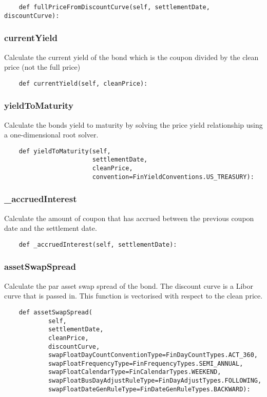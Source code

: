 \documentclass[twoside,11pt]{book}
\begin{document}
\begin{lstlisting}
    def fullPriceFromDiscountCurve(self, settlementDate, discountCurve):
\end{lstlisting}

\subsubsection*{{\bf currentYield}}
Calculate the current yield of the bond which is the coupon divided by the clean price (not the full price) 

\begin{lstlisting}
    def currentYield(self, cleanPrice):
\end{lstlisting}

\subsubsection*{{\bf yieldToMaturity}}
Calculate the bonds yield to maturity by solving the price yield relationship using a one-dimensional root solver.  

\begin{lstlisting}
    def yieldToMaturity(self,
                        settlementDate,
                        cleanPrice,
                        convention=FinYieldConventions.US_TREASURY):
\end{lstlisting}

\subsubsection*{{\bf \_accruedInterest}}
Calculate the amount of coupon that has accrued between the previous coupon date and the settlement date.  

\begin{lstlisting}
    def _accruedInterest(self, settlementDate):
\end{lstlisting}

\subsubsection*{{\bf assetSwapSpread}}
Calculate the par asset swap spread of the bond. The discount curve is a Libor curve that is passed in. This function is vectorised with respect to the clean price.  

\begin{lstlisting}
    def assetSwapSpread(
            self,
            settlementDate,
            cleanPrice,
            discountCurve,
            swapFloatDayCountConventionType=FinDayCountTypes.ACT_360,
            swapFloatFrequencyType=FinFrequencyTypes.SEMI_ANNUAL,
            swapFloatCalendarType=FinCalendarTypes.WEEKEND,
            swapFloatBusDayAdjustRuleType=FinDayAdjustTypes.FOLLOWING,
            swapFloatDateGenRuleType=FinDateGenRuleTypes.BACKWARD):
\end{lstlisting}
\end{document}

